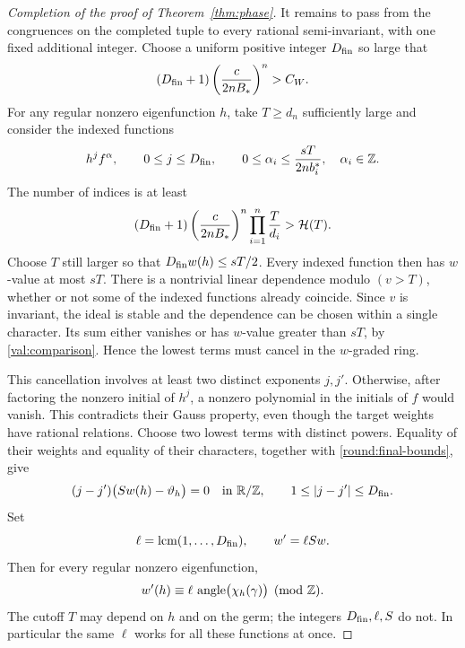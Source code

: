 \begin{proof}[Completion of the proof of Theorem~\ref{thm:phase}]
It remains to pass from the congruences on the completed tuple
to every rational semi-invariant, with one fixed additional
integer. Choose a uniform positive integer $D_{\rm fin}$ so
large that
\begin{equation}\label{round:final-count-constant}
 (D_{\rm fin}+1)\left(\frac{c}{2nB_*}\right)^n>C_W.
\end{equation}
For any regular nonzero eigenfunction $h$, take $T\ge d_n$
sufficiently large and consider the indexed functions
\begin{equation}\label{round:all-character-box}
 h^jf^\alpha,\qquad 0\le j\le D_{\rm fin},\qquad
 0\le\alpha_i\le\frac{sT}{2n b_i^*},\quad\alpha_i\in\mathbb Z.
\end{equation}
The number of indices is at least
\[
 (D_{\rm fin}+1)\left(\frac{c}{2nB_*}\right)^n
                  \prod_{i=1}^n\frac T{d_i}
 >\mathcal H(T).
\]
Choose $T$ still larger so that $D_{\rm fin}w(h)\le sT/2$.
Every indexed function then has $w$-value at most $sT$.
There is a nontrivial linear dependence modulo $(v>T)$,
whether or not some of the indexed functions already coincide.
Since $v$ is invariant, the ideal is stable and the dependence
can be chosen within a single character. Its sum either
vanishes or has $w$-value greater than $sT$, by
\eqref{val:comparison}. Hence the lowest terms must cancel
in the $w$-graded ring.

This cancellation involves at least two distinct exponents
$j,j'$. Otherwise, after factoring the nonzero initial of
$h^j$, a nonzero polynomial in the initials of $f$ would
vanish. This contradicts their Gauss property, even though
the target weights have rational relations. Choose two
lowest terms with distinct powers. Equality of their weights
and equality of their characters, together with
\eqref{round:final-bounds}, give
\begin{equation}\label{round:torsion}
 (j-j')\bigl(Sw(h)-\vartheta_h\bigr)=0
                      \quad\text{in }\mathbb R/\mathbb Z,
 \qquad 1\le|j-j'|\le D_{\rm fin}.
\end{equation}
Set
\begin{equation}\label{round:phase-valuation}
 \ell=\operatorname{lcm}(1,\ldots,D_{\rm fin}),\qquad
 w'=\ell S w.
\end{equation}
Then for every regular nonzero eigenfunction,
\[
 w'(h)\equiv\ell\,\operatorname{angle}\bigl(\chi_h(\gamma)\bigr)\pmod{\mathbb Z}.
\]
The cutoff $T$ may depend on $h$ and on the germ; the integers
$D_{\rm fin},\ell,S$ do not. In particular the same $\ell$
works for all these functions at once.


\end{proof}
